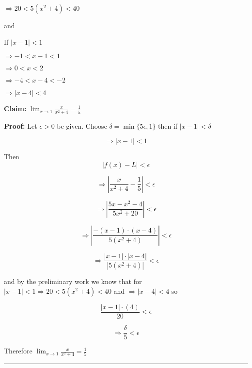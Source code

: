 \documentclass[10pt,letterpaper]{article}
\newcommand\ds{\displaystyle}
\newcommand\qedsym{\hfill \rule{2mm}{2mm}}
\begin{document}
$\Rightarrow 20 < 5(x^2+4) < 40$

and

If $|x-1| < 1$

$\Rightarrow -1 < x-1 < 1$

$\Rightarrow 0 < x < 2$

$\Rightarrow -4 < x-4 < -2$

$\Rightarrow |x-4| < 4$

\medskip

\textbf{Claim:} $\ds\lim_{x\to 1}\frac{x}{x^2+4} = \frac{1}{5}$

\medskip

\textbf{Proof:} Let $\epsilon > 0$ be given. Choose $\delta = \min\{5\epsilon, 1\}$ then if $|x-1| < \delta$

\[\Rightarrow |x-1| < 1\]

Then \[|f(x) - L| < \epsilon\]

\[\Rightarrow \left|\frac{x}{x^2+4} - \frac{1}{5}\right| < \epsilon\]

\[\Rightarrow \left|\frac{5x - x^2 - 4}{5x^2+20}\right| < \epsilon\]

\[\Rightarrow  \left|\frac{-(x-1)\cdot(x-4)}{5(x^2+4)}\right| < \epsilon\]

\[\Rightarrow  \frac{|x-1|\cdot|x-4|}{|5(x^2+4)|} < \epsilon\]

and by the preliminary work we know that for $|x-1| < 1\Rightarrow 20 < 5(x^2+4) < 40$ and $\Rightarrow |x-4| < 4$ so

\[\frac{|x-1|\cdot(4)}{20}<\epsilon\]

\[\Rightarrow \frac{\delta}{5}<\epsilon\]

Therefore $\ds\lim_{x\to 1}\frac{x}{x^2+4} = \frac{1}{5}$

\qedsym
 
\end{document}
